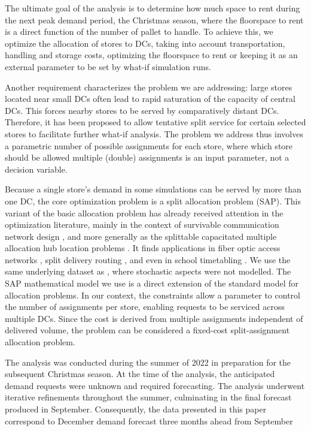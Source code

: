\documentclass[mnsc,sglanonrev]{informs4}  %
\theoremstyle{remark}\newtheorem{remark}{Remark}
\begin{document}
The ultimate goal of the analysis is to determine how much space to rent during the next peak demand period, the Christmas season, where the floorspace to rent is a direct function of the number of pallet to handle. To achieve this, we optimize the allocation of stores to DCs, taking into account transportation, handling and storage costs, optimizing the floorspace to rent or keeping it as an external parameter to be set by what-if simulation runs.

Another requirement characterizes the problem we are addressing: large stores located near small DCs often lead to rapid saturation of the capacity of central DCs. This forces nearby stores to be served by comparatively distant DCs. Therefore, it has been proposed to allow tentative split service for certain selected stores to facilitate further what-if analysis. The problem we address thus involves a parametric number of possible assignments for each store, where which store should be allowed multiple (double) assignments is an input parameter, not a decision variable.  

Because a single store's demand in some simulations can be served by more than one DC, the core optimization problem is a split allocation problem (SAP). This variant of the basic allocation problem has already received attention in the optimization literature, mainly in the context of survivable communication network design \citep{MKE75}, and more generally as the splittable capacitated multiple allocation hub location problems \citep{M05}. It finds applications in fiber optic access networks \citep{KLH11}, split delivery routing \citep{DT89}, and even in school timetabling \citep{BBL07}. We use the same underlying dataset as \citet{ZHHY21}, where stochastic aspects were not modelled.
The SAP mathematical model we use is a direct extension of the standard model for allocation problems. In our context, the constraints allow a parameter to control the number of assignments per store, enabling requests to be serviced across multiple DCs. Since the cost is derived from multiple assignments independent of delivered volume, the problem can be considered a fixed-cost split-assignment allocation problem.

The analysis was conducted during the summer of 2022 in preparation for the subsequent Christmas season. At the time of the analysis, the anticipated demand requests were unknown and required forecasting. The analysis underwent iterative refinements throughout the summer, culminating in the final forecast produced in September. Consequently, the data presented in this paper correspond to December demand forecast three months ahead from September
\end{document}
